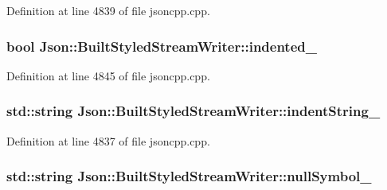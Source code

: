Definition at line 4839 of file jsoncpp.\+cpp.

\subsubsection[{\texorpdfstring{indented\+\_\+}{indented_}}]{\setlength{\rightskip}{0pt plus 5cm}bool Json\+::\+Built\+Styled\+Stream\+Writer\+::indented\+\_\+\hspace{0.3cm}{\ttfamily [private]}}\hypertarget{struct_json_1_1_built_styled_stream_writer_a6aa0ad023e623f600103631a6bca6d10}{}\label{struct_json_1_1_built_styled_stream_writer_a6aa0ad023e623f600103631a6bca6d10}


Definition at line 4845 of file jsoncpp.\+cpp.

\subsubsection[{\texorpdfstring{indent\+String\+\_\+}{indentString_}}]{\setlength{\rightskip}{0pt plus 5cm}std\+::string Json\+::\+Built\+Styled\+Stream\+Writer\+::indent\+String\+\_\+\hspace{0.3cm}{\ttfamily [private]}}\hypertarget{struct_json_1_1_built_styled_stream_writer_a2abfd5beb7f33adc3f690ce4f618aa2f}{}\label{struct_json_1_1_built_styled_stream_writer_a2abfd5beb7f33adc3f690ce4f618aa2f}


Definition at line 4837 of file jsoncpp.\+cpp.

\subsubsection[{\texorpdfstring{null\+Symbol\+\_\+}{nullSymbol_}}]{\setlength{\rightskip}{0pt plus 5cm}std\+::string Json\+::\+Built\+Styled\+Stream\+Writer\+::null\+Symbol\+\_\+\hspace{0.3cm}{\ttfamily [private]}}\hypertarget{struct_json_1_1_built_styled_stream_writer_a238a8f4737c9835af78ea80cc4f12658}{}\label{struct_json_1_1_built_styled_stream_writer_a238a8f4737c9835af78ea80cc4f12658}


